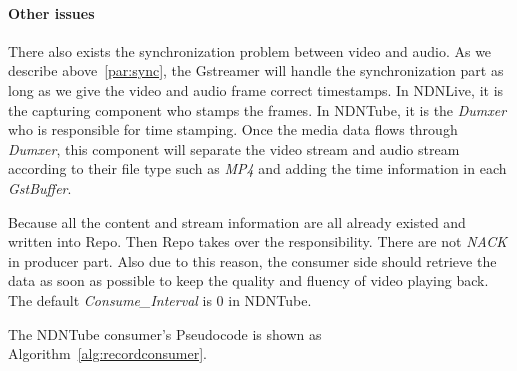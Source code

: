\paragraph{Other issues} %
\label{par:synchronization_between_video_and_audio}
\vspace{0.3cm}
There also exists the synchronization problem between video and audio. As we describe above~\ref{par:sync}, the Gstreamer will handle the synchronization part as long as we give the video and audio frame correct timestamps. In NDNLive, it is the capturing component who stamps the frames. In NDNTube, it is the \textit{Dumxer} who is responsible for time stamping. Once the media data flows through \textit{Dumxer}, this component will separate the video stream and audio stream according to their file type such as \textit{MP4} and adding the time information in each \textit{GstBuffer}.

Because all the content and stream information are all already existed and written into Repo. Then Repo takes over the responsibility. There are not \textit{NACK} in producer part. Also due to this reason, the consumer side should retrieve the data as soon as possible to keep the quality and fluency of video playing back. The default \textit{Consume\_Interval} is 0 in NDNTube.  

The NDNTube consumer's Pseudocode is shown as Algorithm~\ref{alg:recordconsumer}.

